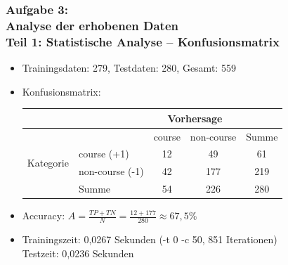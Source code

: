 \documentclass[accentcolor=tud7b,noresetcounter]{tudbeamer}
\begin{document}
	\begin{frame}
		\frametitle{Aufgabe 3:\\ Analyse der erhobenen Daten\\ Teil 1: Statistische Analyse -- Konfusionsmatrix}
		\begin{itemize}
			\item Trainingsdaten: 279, Testdaten: 280, Gesamt: 559
			\item Konfusionsmatrix: \\
			\begin{tabular}{|l|l|c|c||c|}
		\hline
			& & \multicolumn{2}{c|}{Vorhersage} & \\
			\hline
			& & course & non-course & Summe \\
			\hline
		\multirow{2}{*}{Kategorie} & course (+1) & 12 & 49 & 61\\
		\cline{2-5}
		& non-course (-1) & 42 & 177 & 219\\
		\hline
		& Summe & 54 & 226 & 280 \\
		\hline
		\end{tabular}
			\item Accuracy: $A = \frac{TP + TN}{N} = \frac{12+177}{280} \approx 67,5\%$
			\item Trainingszeit: 0,0267 Sekunden (-t 0 -c 50, 851 Iterationen)\\
				Testzeit: 0,0236 Sekunden
		\end{itemize}

		

	\end{frame}
	
	\newcommand{\plotOf}[3]{
 \resizebox {0.9\columnwidth} {!} {
	  \begin{tikzpicture}
	  
	    \begin{axis}[
	    axis lines=middle,
	    axis line style={->},
	    x label style={at={(axis description cs:0.5,-0.1)},anchor=north},
	    y label style={at={(axis description cs:-0.1,.5)},rotate=90,anchor=south},
	    xlabel={#1},
	    ylabel={#2},
	    ]
	    \addplot table [x=features, y=#3,col sep=semicolon]
	    {../Aufg03/3.3result.csv};
	  \end{axis}
	  \end{tikzpicture}
	  }
}
	
\end{document}
